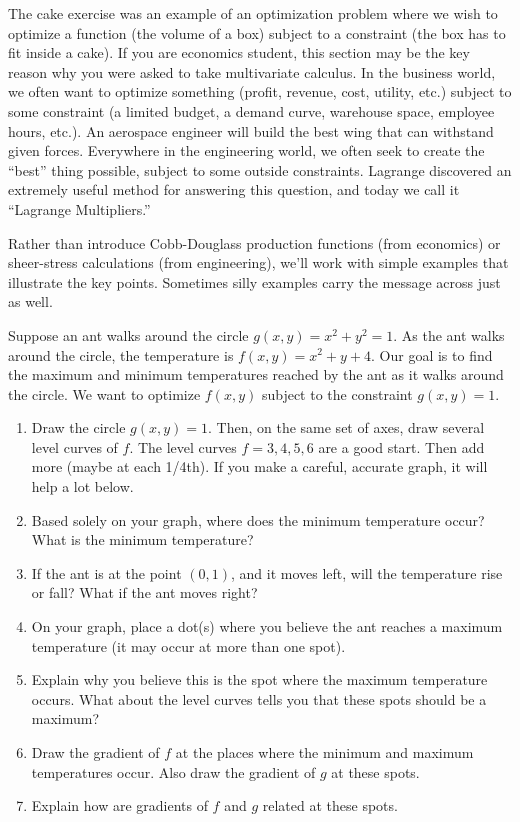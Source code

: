 The cake exercise was an example of an optimization problem where we wish to optimize a function (the volume of a box) subject to a constraint (the box has to fit inside a cake).  If you are economics student, this section may be the key reason why you were asked to take multivariate calculus.  In the business world, we often want to optimize something (profit, revenue, cost, utility, etc.) subject to some constraint (a limited budget, a demand curve, warehouse space, employee hours, etc.). An aerospace engineer will build the best wing that can withstand given forces. Everywhere in the engineering world, we often seek to create the ``best'' thing possible, subject to some outside constraints.  Lagrange discovered an extremely useful method for answering this question, and today we call it ``Lagrange Multipliers.'' 

Rather than introduce Cobb-Douglass production functions (from economics) or sheer-stress calculations (from engineering), we'll work with simple examples that illustrate the key points.  Sometimes silly examples carry the message across just as well.

\begin{problem}
 Suppose an ant walks around the circle $g(x,y)=x^2+y^2=1$.  As the ant walks around the circle, the temperature is $f(x,y) = x^2+y+4$.  Our goal is to find the maximum and minimum temperatures reached by the ant as it walks around the circle. We want to optimize $f(x,y)$ subject to the constraint $g(x,y)=1$. 
 \begin{enumerate}
  \item Draw the circle $g(x,y)=1$.  Then, on the same set of axes, draw several level curves of $f$. The level curves $f=3, 4, 5, 6$ are a good start. Then add more (maybe at each 1/4th). If you make a careful, accurate graph, it will help a lot below.
  \item Based solely on your graph, where does the minimum temperature occur?  What is the minimum temperature?
  \item If the ant is at the point $(0,1)$, and it moves left, will the temperature rise or fall?  What if the ant moves right? 
  \item On your graph, place a dot(s) where you believe the ant reaches a maximum temperature (it may occur at more than one spot). 
	\item Explain why you believe this is the spot where the maximum temperature occurs. What about the level curves tells you that these spots should be a maximum?
  \item Draw the gradient of $f$ at the places where the minimum and maximum temperatures occur. Also draw the gradient of $g$ at these spots.  
	\item Explain how are gradients of $f$ and $g$ related at these spots.
 \end{enumerate}
\end{problem}

